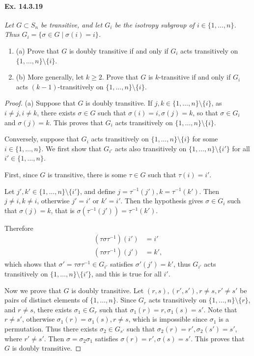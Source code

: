 \documentclass[11pt,a4paper]{article}
\newcommand{\be} {\begin{enumerate}}
\newcommand{\ee} {\end{enumerate}}
\begin{document}
 \paragraph{Ex. 14.3.19}{\it Let $G \subset S_n$ be transitive, and let $G_i$ be the isotropy subgroup of $i\in \{1,\ldots,n\}$. Thus $G_i = \{\sigma \in G \mid  \sigma(i) = i\}$.
 \be
 \item[(a)] Prove that $G$ is doubly transitive if and only if $G_i$ acts transitively on $\{1,\ldots,n\} \setminus \{i\}$.
 \item[(b)] More generally, let $k\geq 2$. Prove that $G$ is $k$-transitive if and only if $G_i$ acts $(k-1)$-transitively on $\{1,\ldots,n\} \setminus \{i\}$.
 \ee
 }
 \begin{proof}
 \item[(a)] Suppose that $G$ is doubly transitive. If  $j,k\in \{1,\ldots,n\} \setminus \{i\}$, as $i \ne j, i\ne k$, there exists $\sigma \in G$ such that $\sigma(i) = i, \sigma(j) = k$, so that $\sigma \in G_i$  and $\sigma(j) = k$. This proves that $G_i$ acts transitively on $\{1,\ldots,n\} \setminus \{i\}$.
 
 Conversely, suppose that $G_i$ acts transitively on $\{1,\ldots,n\} \setminus \{i\}$ for some $i \in \{1,\ldots,n\}$.
We first show that $G_{i'}$ acts also transitively on $\{1,\ldots,n\} \setminus \{i'\}$ for all $i' \in \{1,\ldots,n\}$. 

First, since $G$ is transitive, there is some $\tau \in G$ such that $\tau(i) = i'$.

Let $j' , k' \in \{1,\ldots,n\} \setminus \{i'\}$, and define $j = \tau^{-1}(j'), k = \tau^{-1}(k')$. Then $j \ne i, k \ne i$, otherwise $j'= i'$ or $k' =i'$.
Then the hypothesis gives $\sigma \in G_i$ such that $\sigma(j) =k$, that is $\sigma(\tau^{-1}(j')) =\tau^{-1}(k')$.

Therefore
\begin{align*}
(\tau \sigma \tau^{-1})(i') &= i'\\
(\tau \sigma \tau^{-1})(j') &= k',
\end{align*}
 which shows that $\sigma'  = \tau \sigma \tau^{-1}\in G_{i'}$ satisfies $\sigma'(j') = k'$, thus $G_{i'}$ acts transitively on $\{1,\ldots,n\} \setminus \{i'\}$, and this is true for all $i'$.

Now we prove that $G$ is doubly transitive. Let $(r,s),(r',s'),r\ne s, r'\ne s'$ be pairs of distinct elements of $\{1,\ldots,n\}$. 	
Since $G_{r}$ acts transitively on $\{1,\ldots,n\} \setminus \{r\}$, and $r\ne s$, there exists $\sigma_1 \in G_r$ such that $\sigma_1(r) = r, \sigma_1(s) = s'$. Note that $r \ne s'$, otherwise $\sigma_1(r) = \sigma_1(s) ,r\ne s$, which is impossible since $\sigma_1$ is a permutation. Thus there exists $\sigma_2 \in G_{s'}$ such that $\sigma_2(r) = r', \sigma_2(s') = s'$, where $r'\ne s'$. Then $\sigma = \sigma_2\sigma_1$ satisfies $\sigma(r) = r', \sigma(s) = s'$. This proves that $G$ is doubly transitive.


\end{proof}
\end{document}
